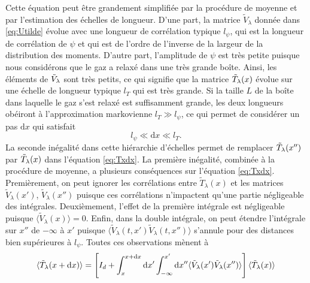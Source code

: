 \documentclass[submission,Phys,10pt]{SciPost}%
\begin{document}
{Cette équation peut être grandement simplifiée par la procédure de moyenne et par l'estimation des échelles de longueur. D'une part, la matrice $\tilde{V}_\lambda$ donnée dans \eqref{eq:Utilde} évolue avec une longueur de corrélation typique $l_\psi$, qui est la longueur de corrélation de $\psi$ et qui est de l'ordre de l'inverse de la largeur de la distribution des moments. D'autre part, l'amplitude de $\psi$ est très petite puisque nous considérons que le gaz a relaxé dans une très grande boîte. Ainsi, les éléments de $\Tilde{V}_{\lambda}$ sont très petits, ce qui signifie que la matrice $\Tilde{T}_{\lambda}(x)$ évolue sur une échelle de longueur typique $l_T$ qui est très grande. Si la taille $L$ de la boîte dans laquelle le gaz s'est relaxé est suffisamment grande, les deux longueurs obéiront à l'approximation markovienne $l_T\gg l_\psi$, ce qui permet de considérer un pas $\mathrm{d}x$ qui satisfait 
\begin{equation}
    l_\psi \ll \mathrm{d}x \ll l_T.
\end{equation}
La seconde inégalité dans cette hiérarchie d'échelles permet de remplacer $\Tilde{T}_{\lambda}(x'')$ par $\Tilde{T}_{\lambda}(x)$ dans l'équation \eqref{eq:Txdx}. La première inégalité, combinée à la procédure de moyenne, a plusieurs conséquences sur l'équation \eqref{eq:Txdx}. Premièrement, on peut ignorer les corrélations entre $\tilde{T}_\lambda(x)$ et les matrices $\tilde{V}_\lambda(x')$, $\tilde{V}_\lambda(x'')$ puisque ces corrélations n'impactent qu'une partie négligeable des intégrales. Deuxièmement, l'effet de la première intégrale est négligeable puisque $\langle \tilde V_\lambda(x)\rangle =0$. Enfin, dans la double intégrale, on peut étendre l'intégrale sur $x''$ de $-\infty$ à $x'$ puisque $\langle \tilde V_\lambda(t,x')\tilde V_\lambda(t,x'')\rangle$ s'annule pour des distances bien supérieures à $l_\psi$. Toutes ces observations mènent à 
\begin{eqnarray}
\langle \Tilde{T}_{\lambda}(x+\mathrm{d}x) \rangle= \left [ I_d+\int_{x}^{x+\mathrm{d}x}\mathrm{d}x' \int_{-\infty}^{x'}\mathrm{d}x'' \langle \Tilde{V}_{\lambda}(x')\Tilde{V}_{\lambda}(x'')\rangle \right ] \langle \Tilde{T}_{\lambda}(x)\rangle
\label{equ:d}
\end{eqnarray}

}
\end{document}
